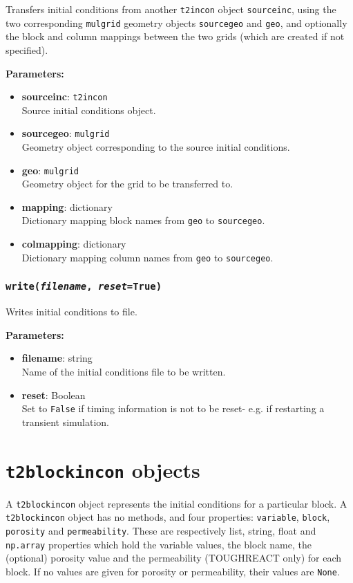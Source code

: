 Transfers initial conditions from another \texttt{t2incon} object \texttt{sourceinc}, using the two corresponding \texttt{mulgrid} geometry objects \texttt{sourcegeo} and \texttt{geo}, and optionally the block and column mappings between the two grids (which are created if not specified).

\textbf{Parameters:}
\begin{itemize}
\item \textbf{sourceinc}: \texttt{t2incon}\\
  Source initial conditions object.
\item \textbf{sourcegeo}: \texttt{mulgrid}\\
  Geometry object corresponding to the source initial conditions.
\item \textbf{geo}: \texttt{mulgrid}\\
  Geometry object for the grid to be transferred to.
\item \textbf{mapping}: dictionary\\
  Dictionary mapping block names from \texttt{geo} to \texttt{sourcegeo}.
\item \textbf{colmapping}: dictionary\\
  Dictionary mapping column names from \texttt{geo} to \texttt{sourcegeo}.
\end{itemize}

\subsubsection{\texttt{write(\emph{filename}, \emph{reset}=True)}}

Writes initial conditions to file.

\textbf{Parameters:}
\begin{itemize}
\item \textbf{filename}: string\\
  Name of the initial conditions file to be written.
\item \textbf{reset}: Boolean\\
  Set to \texttt{False} if timing information is not to be reset- e.g. if restarting a transient simulation.
\end{itemize}

\section{\texttt{t2blockincon} objects}
\label{t2blockincons}

A \texttt{t2blockincon} object represents the initial conditions for a particular block.  A \texttt{t2blockincon} object has no methods, and four properties: \texttt{variable}, \texttt{block}, \texttt{porosity} and \texttt{permeability}.  These are respectively list, string, float and \texttt{np.array} properties which hold the variable values, the block name, the (optional) porosity value and the permeability (TOUGHREACT only) for each block.  If no values are given for porosity or permeability, their values are \texttt{None}.

